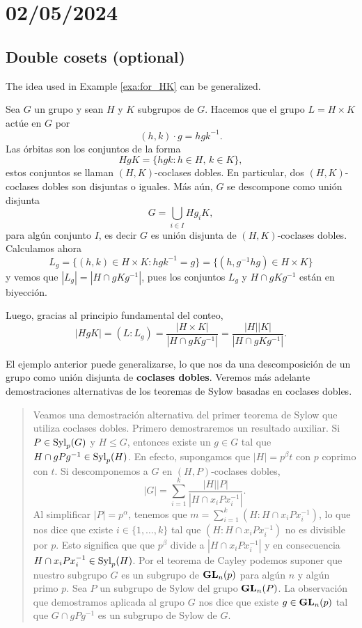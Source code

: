 \section{02/05/2024}

\subsection{Double cosets (optional)}

The idea used in Example \ref{exa:for_HK} can be generalized. 

\begin{example}
Sea $G$ un grupo y sean $H$ y $K$ subgrupos de $G$. Hacemos
que el grupo $L=H\times K$ actúe en $G$ por
\[
(h,k)\cdot g=hgk^{-1}.
\]
Las órbitas son los conjuntos de la forma
\[
HgK=\{hgk:h\in H,\,k\in K\},
\]
estos conjuntos se llaman $(H,K)$-coclases dobles.
En particular, dos $(H,K)$-coclases dobles son disjuntas o iguales. Más aún,
$G$ se descompone como unión disjunta
\[
G=\bigcup_{i\in I}Hg_iK,
\]
para algún conjunto $I$, es decir $G$
es unión disjunta de $(H,K)$-coclases dobles.
Calculamos ahora
\[
L_g=\{(h,k)\in H\times K:hgk^{-1}=g\}=\{(h,g^{-1}hg)\in H\times K\}
\]
y vemos que $|L_g|=|H\cap gKg^{-1}|$, pues los conjuntos $L_g$ y $H\cap gKg^{-1}$ están en biyección.

Luego,
gracias al principio fundamental del conteo,
\[
|HgK|=(L:L_g)=\frac{|H\times K|}{|H\cap gKg^{-1}|}=\frac{|H||K|}{|H\cap gKg^{-1}|}.
\]
\end{example}

El ejemplo anterior puede generalizarse, lo que nos da una descomposición
de un grupo como unión disjunta de \textbf{coclases dobles}. Veremos más adelante
demostraciones alternativas de los teoremas de Sylow basadas en
coclases dobles.

\begin{quote}
Veamos una demostración alternativa del primer teorema de Sylow
que utiliza coclases dobles.
Primero demostraremos un resultado auxiliar. Si $P\in\mathrm{Syl}_p(G)$ y $H\leq G$, entonces
existe un $g\in G$ tal que $H\cap gPg^{-1}\in\mathrm{Syl}_p(H)$. En efecto, supongamos que
$|H|=p^\beta t$ con $p$ coprimo con $t$.
Si descomponemos a $G$ en $(H,P)$-coclases dobles,
\[
|G|=\sum_{i=1}^k \frac{|H||P|}{|H\cap x_iPx_i^{-1}|}.
\]
Al simplificar $|P|=p^\alpha$, tenemos que $m=\sum_{i=1}^k(H:H\cap x_iPx_i^{-1})$, lo que nos dice
que existe $i\in\{1,\dots,k\}$ tal que
$(H:H\cap x_iPx_i^{-1})$ no es divisible por $p$. Esto significa que que
$p^\beta$ divide a $|H\cap x_iPx_i^{-1}|$ y en consecuencia $H\cap x_iPx_i^{-1}\in\mathrm{Syl}_p(H)$.
Por el teorema de Cayley podemos suponer que nuestro subgrupo $G$ es un subgrupo
de $\mathbf{GL}_n(p)$ para algún $n$ y algún primo $p$. Sea $P$ un subgrupo de Sylow
del grupo $\mathbf{GL}_n(P)$. La observación que demostramos
aplicada al grupo $G$ nos dice que existe $g\in \mathbf{GL}_n(p)$ tal que $G\cap gPg^{-1}$ es un subgrupo de
Sylow de $G$.
\end{quote}

